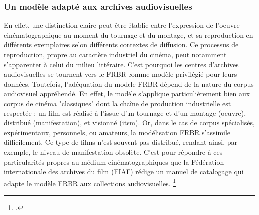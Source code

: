 \subsubsection{Un modèle adapté aux archives audiovisuelles}
En effet, une distinction claire peut être établie entre l'expression de l'oeuvre cinématographique au moment du tournage et du montage, et sa reproduction en différents exemplaires selon différents contextes de diffusion. Ce processus de reproduction, propre au caractère industriel du cinéma, peut notamment s'apparenter à celui du milieu littéraire. C'est pourquoi les centres d'archives audiovisuelles se tournent vers le FRBR comme modèle privilégié pour leurs données.  
Toutefois, l'adéquation du modèle FRBR dépend de la nature du corpus audiovisuel appréhendé. En effet, le modèle s'applique particulièrement bien aux corpus de cinéma "classiques" dont la chaîne de production industrielle est respectée : un film est réalisé à l'issue d'un tournage et d'un montage (oeuvre), distribué (manifestation), et visionné (item). Or, dans le cas de corpus spécialisés, expérimentaux, personnels, ou amateurs, la modélisation FRBR s'assimile difficilement. Ce type de films n'est souvent pas distribué, rendant ainsi, par exemple, le niveau de manifestation obsolète. 
C'est pour répondre à ces particularités propres au médium cinématographiques que la Fédération internationale des archives du film (FIAF) rédige un manuel de catalogage qui adapte le modèle FRBR aux collections audiovisuelles. \footcite{zotero-item-644} 



